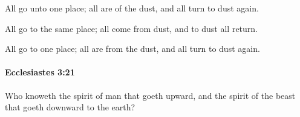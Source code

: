 			\begin{versebox}
					\item[BHS] 
					\item[LXX] 
					\item[ASV] All go unto one place; all are of the dust, and all turn to dust again.
					\item[NIV] All go to the same place; all come from dust, and to dust all return.
					\item[NRSV] All go to one place; all are from the dust, and all turn to dust again.
			\end{versebox}

		\paragraph{Ecclesiastes 3:21} %
			\label{ECCLESIASTES-3-21}

			Who knoweth the spirit of man that goeth upward, and the spirit of the beast that goeth downward to the earth?


